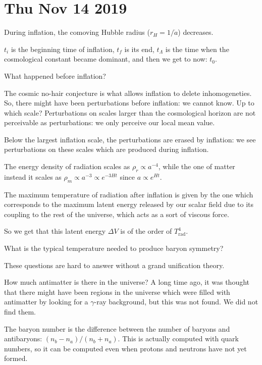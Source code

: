 \documentclass[main.tex]{subfiles}
\begin{document}
\section*{Thu Nov 14 2019}

During inflation, the comoving Hubble radius (\(r_H = 1/\dot{a}\)) decreases.

\(t_i\) is the beginning time of inflation, \(t_f\) is its end, \(t_\Lambda \) is the time when the cosmological constant became dominant, and then we get to now: \(t_0 \).

What happened before inflation?

The cosmic no-hair conjecture is what allows inflation to delete inhomogeneties.
So, there might have been perturbations before inflation: we cannot know.
Up to which scale? Perturbations on scales larger than the cosmological horizon are not perceivable as perturbations: we only perceive our local mean value.

Below the largest inflation scale, the perturbations are erased by inflation: we see perturbations on these scales which are produced during inflation.

The energy density of radiation scales as \(\rho _r \propto a^{-4}\), while the one of matter instead it scales as \(\rho _m \propto a^{-3} \propto e^{-3Ht}\) since \(a \propto e^{Ht}\).

The maximum temperature of radiation after inflation is given by the one which corresponds to the maximum latent energy released by our scalar field due to its coupling to the rest of the universe, which acts as a sort of viscous force.

So we get that this latent energy \(\Delta V\) is of the order of \(T^{4}_{\text{rad}}\).

What is the typical temperature needed to produce baryon symmetry? 


These questions are hard to answer without a grand unification theory.

How much antimatter is there in the universe?
A long time ago, it was thought that there might have been regions in the universe which were filled with antimatter by looking for a \(\gamma \)-ray background, but this was not found.
We did not find them.

The baryon number is the difference between the number of baryons and antibaryons: \((n_b - n_a) / (n_b + n_a)\). This is actually computed with quark numbers, so it can be computed even when protons and neutrons have not yet formed.
\end{document}
